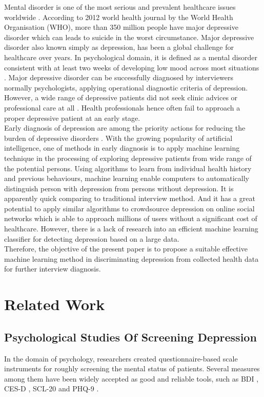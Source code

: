 \documentclass[12pt]{article}
\begin{document}
Mental disorder is one of the most serious and prevalent healthcare issues worldwide \cite{Wongkoblap}. According to 2012 world health journal by the World Health Organisation (WHO), more than 350 million people have major depressive disorder which can leads to suicide in the worst circumstance. Major depressive disorder also known simply as depression, has been a global challenge for healthcare over years. In psychological domain, it is defined as a mental disorder consistent with at least two weeks of developing low mood across most situations \cite{Zimmerman}. Major depressive disorder can be successfully diagnosed by interviewers normally psychologists, applying operational diagnostic criteria of depression. However, a wide range of depressive patients did not seek clinic advices or professional care at all \cite{Huerta-Ramirez}. Health professionals hence often fail to approach a proper depressive patient at an early stage. 
\\

Early diagnosis of depression are among the priority actions for reducing the burden of depressive disorders \cite{Huerta-Ramirez}. With the growing popularity of artificial intelligence, one of methods in early diagnosis is to apply machine learning technique in the processing of exploring depressive patients from wide range of the potential persons. Using algorithms to learn from individual health history and previous behaviours, machine learning enable computers to automatically distinguish person with depression from persons without depression. It is apparently quick comparing to traditional interview method. And it has a great potential to apply similar algorithms to crowdsource depression on online social networks which is able to approach millions of users without a significant cost of healthcare. However, there is a lack of research into an efficient machine learning classifier for detecting depression based on a large data.
\\

Therefore, the objective of the present paper is to propose a suitable effective machine learning method in discriminating depression from collected health data for further interview diagnosis. 
\\
\bigskip
\goodbreak
\section{Related Work}
\subsection{Psychological Studies Of Screening Depression}
In the domain of psychology, researchers created questionnaire-based scale instruments for roughly screening the mental status of patients. Several measures among them have been widely accepted as good and reliable tools, such as BDI \cite{Huerta-Ramirez}\cite{Tsugawa}, CES-D \cite{De Choudhury}\cite{Tsugawa}, SCL-20 and PHQ-9 \cite{Kroenke}. 
\\
\end{document}
